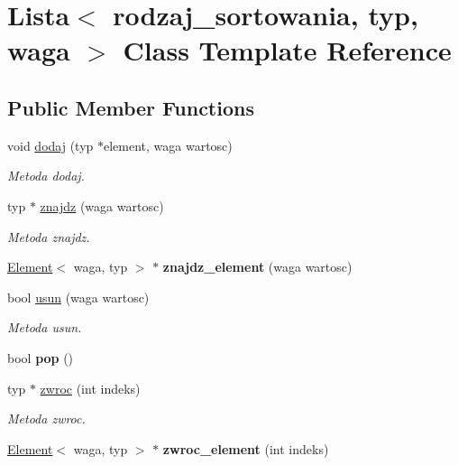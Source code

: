 \hypertarget{class_lista}{\section{Lista$<$ rodzaj\+\_\+sortowania, typ, waga $>$ Class Template Reference}
\label{class_lista}
}
\subsection*{Public Member Functions}
\begin{DoxyCompactItemize}
\item 
void \hyperlink{class_lista_a2f3ca0d9972aba022ec74b79307ca24a}{dodaj} (typ $\ast$element, waga wartosc)
\begin{DoxyCompactList}\small\item\em Metoda dodaj. \end{DoxyCompactList}\item 
typ $\ast$ \hyperlink{class_lista_a5dbc645df44c19d6aaaa6805ed0730b4}{znajdz} (waga wartosc)
\begin{DoxyCompactList}\small\item\em Metoda znajdz. \end{DoxyCompactList}\item 
\hypertarget{class_lista_a9951e96a5a4d6bf8e272d302c4851dbd}{\hyperlink{class_element}{Element}$<$ waga, typ $>$ $\ast$ {\bfseries znajdz\+\_\+element} (waga wartosc)}\label{class_lista_a9951e96a5a4d6bf8e272d302c4851dbd}

\item 
bool \hyperlink{class_lista_a225a14d06207d4292332b21899cf6ca5}{usun} (waga wartosc)
\begin{DoxyCompactList}\small\item\em Metoda usun. \end{DoxyCompactList}\item 
\hypertarget{class_lista_af9558e312448fa668e31ec4f41fe7ce0}{bool {\bfseries pop} ()}\label{class_lista_af9558e312448fa668e31ec4f41fe7ce0}

\item 
typ $\ast$ \hyperlink{class_lista_a61d5b2dc687e7c96ddba9981d786496b}{zwroc} (int indeks)
\begin{DoxyCompactList}\small\item\em Metoda zwroc. \end{DoxyCompactList}\item 
\hypertarget{class_lista_a5ed373ce43b855eec55077741c73f118}{\hyperlink{class_element}{Element}$<$ waga, typ $>$ $\ast$ {\bfseries zwroc\+\_\+element} (int indeks)}\label{class_lista_a5ed373ce43b855eec55077741c73f118}


\end{DoxyCompactItemize}
